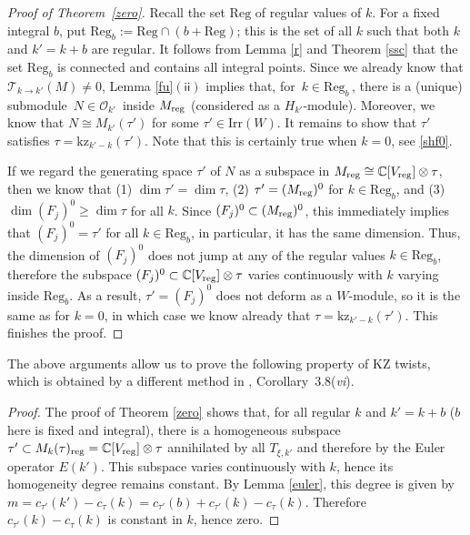 \documentclass{amsart}
\newtheorem{cor}[theorem]{Corollary}
\theoremstyle{definition}
\theoremstyle{remark}
\numberwithin{equation}{section}
\begin{document}
\begin{proof}[Proof of Theorem~\ref{zero}]
Recall the set ${\mathrm{Reg}}$ of regular values of $k$. For a
fixed integral $b$, put ${\mathrm{Reg}}_b:= {\mathrm{Reg}}\cap (b+{\mathrm{Reg}})$; this is the set
of all $k$ such that both $k$ and $k'=k+b$ are regular. It follows
from Lemma \ref{r} and Theorem \ref{ssc} that the set ${\mathrm{Reg}}_b$ is
connected and contains all integral points. Since we already know
that ${\mathcal{T}}_{k \to k'}(M)\ne 0$, Lemma \ref{fu}$\mathsf{(ii)}$
implies that, for $\,k\in{\mathrm{Reg}}_b\,$, there is a (unique) submodule
$\,N \in {\mathcal{O}}_{k'}\,$ inside ${M_{\rm{reg}}}$ (considered as a $H_{k'}$-module).
Moreover, we know that $ N \cong M_{k'}(\tau')$ for some
$\tau'\in{\mathrm{Irr}(W)}$. It remains to show that $\tau'$ satisfies
$\tau={\mathrm{kz}}_{k'-k}(\tau')$. Note that this is certainly true when
$k=0$, see \eqref{shf0}.

If we regard the generating space $\tau'$ of $N$ as a subspace in
${M_{\rm{reg}}} \cong {\mathbb{C}}[{V_{\rm{reg}}}]\otimes\tau$,
then we know that (1) $\dim\tau'=\dim\tau$, (2) $\tau' = ({M_{\rm{reg}}})^0$
for $k\in{\mathrm{Reg}}_b$, and (3) $\dim (F_j)^0\ge\dim\tau$ for all $k$.
Since $(F_j)^0\subset ({M_{\rm{reg}}})^0$, this immediately implies that
$(F_j)^0=\tau'$ for all $k\in{\mathrm{Reg}}_b$, in particular, it has the same
dimension. Thus, the dimension of $(F_j)^0$ does not jump at any of
the regular values $k\in{\mathrm{Reg}}_b$, therefore the subspace
$(F_j)^0\subset {\mathbb{C}}[{V_{\rm{reg}}}]\otimes\tau$ varies continuously with $k$
varying inside ${\mathrm{Reg}}_b$. As a result, $\tau'=(F_j)^0$ does not
deform as a $W$-module, so it is the same as for $k=0$, in which
case we know already that $\tau={\mathrm{kz}}_{k'-k}(\tau')$. This finishes
the proof.
\end{proof}

The above arguments allow us to prove the following property
of KZ twists, which is obtained by a different method in \cite{O3},
Corollary~3.8({\it vi}).

\begin{proof}
The proof of Theorem \ref{zero} shows that, for all regular
$k$ and $k'=k+b$ ($b$ here is fixed and integral), there is a
homogeneous subspace $\tau'\subset
M_k(\tau)_{\mathrm{reg}}={\mathbb{C}}[{V_{\rm{reg}}}]\otimes\tau$ annihilated by all
$T_{\xi, k'}$ and therefore by the Euler operator $E(k')$. This
subspace varies continuously with $k$, hence its homogeneity degree
remains constant. By Lemma \ref{euler}, this degree is given by
$m=c_{\tau'}(k')-c_\tau(k)=c_{\tau'}(b)+c_{\tau'}(k)-c_\tau(k)$.
Therefore $c_{\tau'}(k)-c_\tau(k)$ is constant in $k$,
hence zero.
\end{proof}
\end{document}
